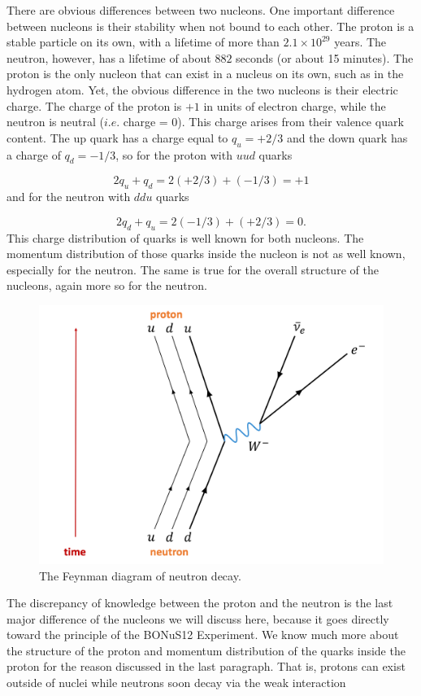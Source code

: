 There are obvious differences between two nucleons. One important difference between nucleons is their stability when not bound to each other. The proton is a stable particle on its own, with a lifetime of more than $2.1 \times 10^{29}$ years. The neutron, however, has a lifetime of about $882$ seconds (or about 15 minutes). The proton is the only nucleon that can exist in a nucleus on its own, such as in the hydrogen atom. Yet, the obvious difference in the two nucleons is their electric charge. The charge of the proton is $+1$ in units of electron charge, while the neutron is neutral ($i.e.$ charge = 0). This charge arises from their valence quark content. The up quark has a charge equal to $q_u = +2/3$ and the down quark has a charge of $q_d = -1/3$, so for the proton with $uud$ quarks

\begin{equation}
2q_u + q_d = 2(+2/3) + (-1/3) = +1
\end{equation}
and for the neutron with $ddu$ quarks

\begin{equation}
2q_d + q_u = 2(-1/3) + (+2/3) = 0.
\end{equation}
This charge distribution of quarks is well known for both nucleons. The momentum distribution of those quarks inside the nucleon is not as well known, especially for the neutron. The same is true for the overall structure of the nucleons, again more so for the neutron.

\begin{figure}[h!]
	\centering
	\includegraphics[width=0.6\linewidth]{figures/neutron_decay.png}
	\caption{The Feynman diagram of neutron decay.}
	\label{fig:neutron_decay}
\end{figure}

The discrepancy of knowledge between the proton and the neutron is the last major difference of the nucleons we will discuss here, because it goes directly toward the principle of the BONuS12 Experiment. We know much more about the structure of the proton and momentum distribution of the quarks inside the proton for the reason discussed in the last paragraph. That is, protons can exist outside of nuclei while neutrons soon decay via the weak interaction

